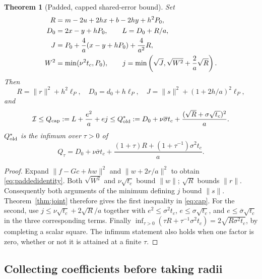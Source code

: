 \documentclass[11pt,a4paper]{article}
\newcommand{\norm}[1]{\lVert #1\rVert}
\newcommand{\Qcap}{Q_{\mathrm{cap}}}
\newcommand{\Iresp}{\mathcal I}
\newcommand{\sigmab}{\overline{\sigma}}
\newtheorem{theorem}{Theorem}[section]
\theoremstyle{definition}
\theoremstyle{remark}
\numberwithin{equation}{section}
\begin{document}
\begin{theorem}[Padded, capped shared-error bound]\label{thm:cap}
Set
\begin{align}
 R&=m-2u+2hx+b-2hy+h^2P_0, \notag\\
 D_0&=2x-y+hP_0,\qquad L=D_0+R/a, \notag\\
 J&=P_0+\frac4a(x-y+hP_0)+\frac4{a^2}R,       \label{eq:RLJ}\\
 W^2&=\min(\nu^2t_c,P_0),\qquad
 j=\min\left(\sqrt J,\sqrt{W^2}+\frac2a\sqrt R\right). \notag
\end{align}
Then
\begin{equation}\label{eq:paddedidentity}
 R=\norm r^2+h^2\ell_P,\quad
 D_0=d_0+h\ell_P,\quad
 J=\norm s^2+(1+2h/a)^2\ell_P,
\end{equation}
and
\begin{equation}\label{eq:cap}
 \Iresp\le\Qcap:=L+\frac{e^2}{a}+ej
 \le Q_{\rm old}^*
 :=D_0+\nu\sigmab t_c+
                  \frac{(\sqrt R+\sigma\sqrt{t_c})^2}{a}.
\end{equation}
$Q_{\rm old}^*$ is the infimum over $\tau>0$ of
\begin{equation}\label{eq:tau}
 Q_\tau=D_0+\nu\sigmab t_c+
       \frac{(1+\tau)R+(1+\tau^{-1})\sigma^2t_c}{a}.
\end{equation}
\end{theorem}
\begin{proof}
Expand $\norm{f-Gc+hw}^2$ and $\norm{w+2r/a}^2$ to obtain
\eqref{eq:paddedidentity}. Both $\sqrt{W^2}$ and $\nu\sqrt{t_c}$
bound $\norm w$; $\sqrt R$ bounds $\norm r$. Consequently both
arguments of the minimum defining $j$ bound $\norm s$.
Theorem~\ref{thm:joint} therefore gives the first inequality in
\eqref{eq:cap}. For the second, use
$j\le\nu\sqrt{t_c}+2\sqrt R/a$ together with
$e^2\le\sigma^2t_c$, $e\le\sigma\sqrt{t_c}$, and
$e\le\sigmab\sqrt{t_c}$ in the three corresponding terms.
Finally
$\inf_{\tau>0}(\tau R+\tau^{-1}\sigma^2t_c)
 =2\sqrt{R\sigma^2t_c}$, by completing a scalar square.
The infimum statement also holds when one factor is zero, whether or
not it is attained at a finite $\tau$.
\end{proof}

\subsection{Collecting coefficients before taking radii}
\end{document}
